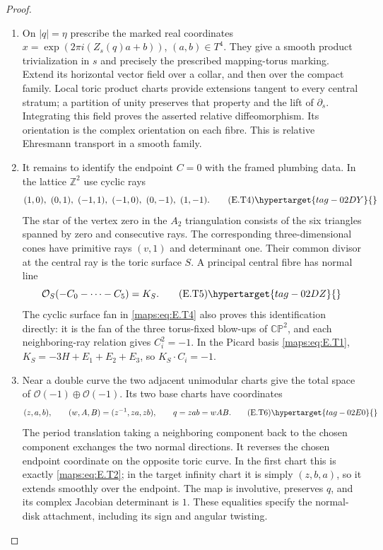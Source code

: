 \begin{proof}
\begin{enumerate}[label={$\langle1\rangle$\arabic*.},leftmargin=*]
\item On $|q|=\eta$ prescribe the marked real coordinates
$x=\exp(2\pi i(Z_s(q)a+b))$, $(a,b)\in T^4$.
They give a smooth product trivialization in $s$ and precisely
the prescribed mapping-torus marking.  Extend its horizontal
vector field over a collar, and then over the compact family.
Local toric product charts provide extensions tangent to
every central stratum; a partition of unity preserves that
property and the lift of $\partial_s$.  Integrating this
field proves the asserted relative diffeomorphism.  Its
orientation is the complex orientation on each fibre.
This is relative Ehresmann transport in a smooth
family.

\item It remains to identify the endpoint $C=0$ with the framed
plumbing data.  In the lattice $\mathbb Z^2$ use cyclic rays
\[
 (1,0),\ (0,1),\ (-1,1),\ (-1,0),\ (0,-1),\ (1,-1).
 \tag{E.T4}\hypertarget{tag-02DY}{}\label{maps:eq:E.T4}
\]
The star of the vertex zero in the $A_2$ triangulation consists
of the six triangles spanned by zero and consecutive rays.
The corresponding three-dimensional cones have primitive rays
$(v,1)$ and determinant one.  Their common divisor at the
central ray is the toric surface $S$.  A principal central
fibre has normal line
\[
             \mathcal O_S(-C_0-\cdots-C_5)=K_S.
 \tag{E.T5}\hypertarget{tag-02DZ}{}\label{maps:eq:E.T5}
\]
The cyclic surface fan in \eqref{maps:eq:E.T4} also proves this identification
directly: it is the fan of the three torus-fixed blow-ups of
$\mathbb {CP}^2$, and each neighboring-ray relation gives
$C_i^2=-1$.  In the Picard basis \eqref{maps:eq:E.T1},
$K_S=-3H+E_1+E_2+E_3$, so $K_S\cdot C_i=-1$.

\item Near a double curve the two adjacent unimodular charts give
the total space of $\mathcal O(-1)\oplus\mathcal O(-1)$.
Its two base charts have coordinates
\[
 (z,a,b),\qquad
 (w,A,B)=(z^{-1},za,zb),\qquad q=zab=wAB.
 \tag{E.T6}\hypertarget{tag-02E0}{}\label{maps:eq:E.T6}
\]
The period translation taking a neighboring component back
to the chosen component exchanges the two normal directions.
It reverses the chosen endpoint coordinate on the opposite
toric curve.  In the first chart this is exactly \eqref{maps:eq:E.T2};
in the target infinity chart it is simply $(z,b,a)$, so it
extends smoothly over the endpoint.  The map is involutive,
preserves $q$, and its complex Jacobian determinant is $1$.
These equalities specify the normal-disk attachment, including
its sign and angular twisting.


\end{enumerate}
\end{proof}
